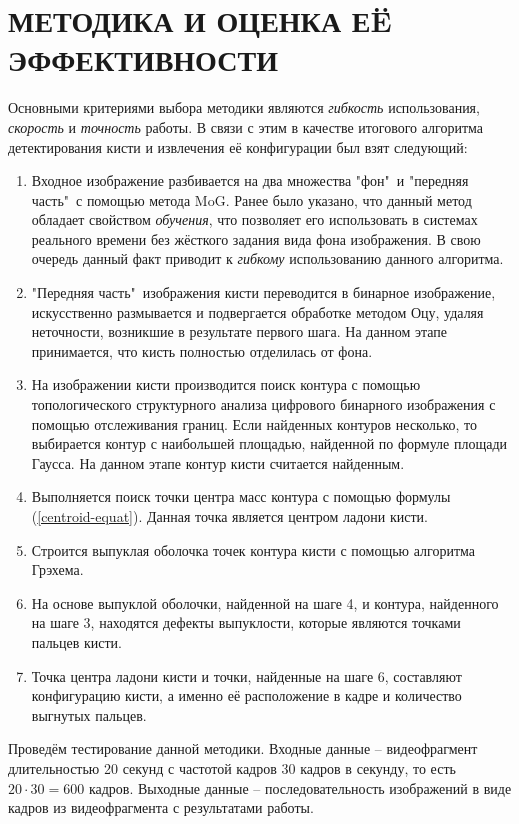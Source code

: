 \section{МЕТОДИКА И ОЦЕНКА ЕË ЭФФЕКТИВНОСТИ}

Основными критериями выбора методики являются {\it гибкость} использования,
{\it скорость} и {\it точность} работы. В связи с этим в качестве итогового алгоритма 
детектирования кисти и извлечения её конфигурации был взят следующий:
\begin{enumerate}
	\item Входное изображение разбивается на два множества "фон"\ и "передняя часть"\ с помощью
метода MoG. Ранее было указано, что данный метод обладает свойством {\it обучения}, что позволяет
его использовать в системах реального времени без жёсткого задания вида фона изображения.
В свою очередь данный факт приводит к {\it гибкому} использованию данного алгоритма.
	\item "Передняя часть"\ изображения кисти переводится в бинарное изображение,
искусственно размывается и подвергается обработке методом Оцу, удаляя неточности, 
возникшие в результате первого шага. На данном этапе принимается, что кисть 
полностью отделилась от фона.
	\item На изображении кисти производится поиск контура с помощью топологического
структурного анализа цифрового бинарного изображения с помощью отслеживания границ. 
Если найденных контуров несколько, то выбирается контур с наибольшей площадью, найденной
по формуле площади Гаусса. На данном этапе контур кисти считается найденным.
	\item Выполняется поиск точки центра масс контура с помощью формулы (\ref{centroid-equat}).
Данная точка является центром ладони кисти.
	\item Строится выпуклая оболочка точек контура кисти с помощью алгоритма Грэхема. 
	\item На основе выпуклой оболочки, найденной на шаге 4, и контура, найденного на шаге 3,
находятся дефекты выпуклости, которые являются точками пальцев кисти. 
	\item Точка центра ладони кисти и точки, найденные на шаге 6, составляют конфигурацию кисти,
а именно её расположение в кадре и количество выгнутых пальцев.
\end{enumerate}

Проведём тестирование данной методики. Входные данные -- видеофрагмент длительностью
20 секунд с частотой кадров 30 кадров в секунду, то есть $20\cdot30 = 600$ кадров.
Выходные данные -- последовательность изображений в виде кадров из видеофрагмента
с результатами работы.

